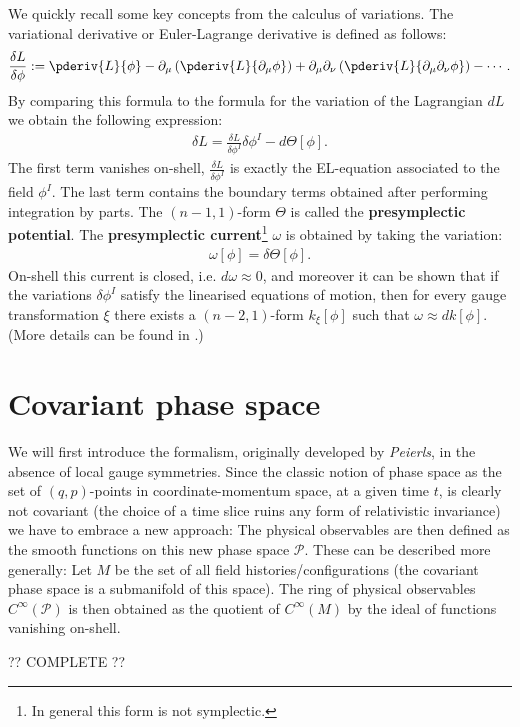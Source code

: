     We quickly recall some key concepts from the calculus of variations. The variational derivative or Euler-Lagrange derivative is defined as follows:
    \begin{gather}
        \frac{\delta L}{\delta \phi} := \pderiv{L}{\phi} - \partial_\mu\left(\pderiv{L}{\partial_\mu\phi}\right) + \partial_\mu\partial_\nu\left(\pderiv{L}{\partial_\mu\partial_\nu\phi}\right) -\cdots.
    \end{gather}
    By comparing this formula to the formula for the variation of the Lagrangian $dL$ we obtain the following expression:
    \begin{gather}
        \delta L = \frac{\delta L}{\delta \phi^I}\delta\phi^I - d\Theta[\phi].
    \end{gather}
    The first term vanishes on-shell, $\frac{\delta L}{\delta \phi^I}$ is exactly the EL-equation associated to the field $\phi^I$. The last term contains the boundary terms obtained after performing integration by parts. The $(n-1, 1)$-form $\Theta$ is called the \textbf{presymplectic potential}. The \textbf{presymplectic current}\footnote{In general this form is not symplectic.} $\omega$ is obtained by taking the variation:
    \begin{gather}
        \omega[\phi] = \delta\Theta[\phi].
    \end{gather}
    On-shell this current is closed, i.e. $d\omega\approx0$, and moreover it can be shown that if the variations $\delta\phi^I$ satisfy the linearised equations of motion, then for every gauge transformation $\xi$ there exists a $(n-2, 1)$-form $k_\xi[\phi]$ such that $\omega\approx dk[\phi]$. (More details can be found in \cite{compere}.)

\section{Covariant phase space}

    We will first introduce the formalism, originally developed by \textit{Peierls}, in the absence of local gauge symmetries. Since the classic notion of phase space as the set of $(q,p)$-points in coordinate-momentum space, at a given time $t$, is clearly not covariant (the choice of a time slice ruins any form of relativistic invariance) we have to embrace a new approach:
    The physical observables are then defined as the smooth functions on this new phase space $\mathcal{P}$. These can be described more generally: Let $M$ be the set of all field histories/configurations (the covariant phase space is a submanifold of this space). The ring of physical observables $C^\infty(\mathcal{P})$ is then obtained as the quotient of $C^\infty(M)$ by the ideal of functions vanishing on-shell.

    ?? COMPLETE ??